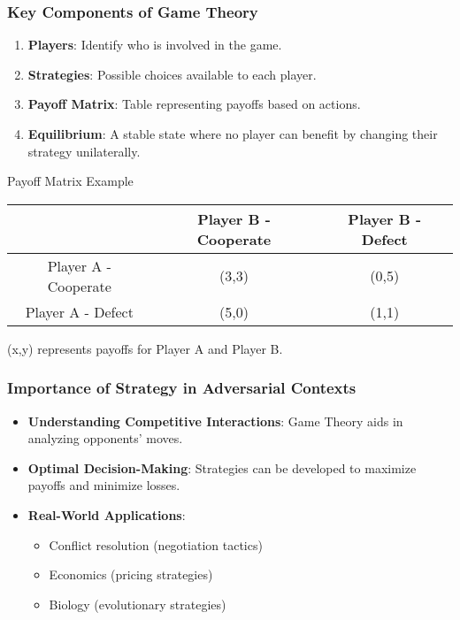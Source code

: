 \documentclass[aspectratio=169]{beamer}
\begin{document}
\begin{frame}[fragile]
    \frametitle{Key Components of Game Theory}
    \begin{enumerate}
        \item \textbf{Players}: Identify who is involved in the game.
        \item \textbf{Strategies}: Possible choices available to each player.
        \item \textbf{Payoff Matrix}: Table representing payoffs based on actions.
        \item \textbf{Equilibrium}: A stable state where no player can benefit by changing their strategy unilaterally.
    \end{enumerate}
    \begin{block}{Payoff Matrix Example}
        \begin{tabular}{|c|c|c|}
            \hline
            & Player B - Cooperate & Player B - Defect \\
            \hline
            Player A - Cooperate & (3,3) & (0,5) \\
            \hline
            Player A - Defect & (5,0) & (1,1) \\
            \hline
        \end{tabular}
        (x,y) represents payoffs for Player A and Player B.
    \end{block}
\end{frame}

\begin{frame}[fragile]
    \frametitle{Importance of Strategy in Adversarial Contexts}
    \begin{itemize}
        \item \textbf{Understanding Competitive Interactions}: Game Theory aids in analyzing opponents' moves.
        \item \textbf{Optimal Decision-Making}: Strategies can be developed to maximize payoffs and minimize losses.
        \item \textbf{Real-World Applications}: 
        \begin{itemize}
            \item Conflict resolution (negotiation tactics)
            \item Economics (pricing strategies)
            \item Biology (evolutionary strategies)
        \end{itemize}
    \end{itemize}
\end{frame}
\end{document}
